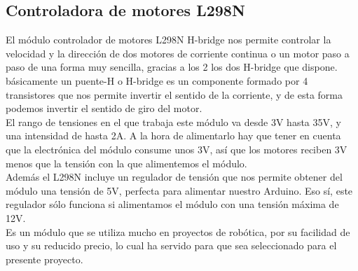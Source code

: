 \subsection{Controladora de motores L298N}


El módulo controlador de motores L298N H-bridge nos permite controlar la velocidad y la dirección de dos motores de corriente continua o un motor paso a paso de una forma muy sencilla,
gracias a los 2 los dos H-bridge que dispone.\\

básicamente un puente-H o H-bridge es un componente formado por 4 transistores que nos permite invertir el sentido de la corriente, y de esta forma podemos 
invertir el sentido de giro del motor.\\

El rango de tensiones en el que trabaja este módulo va desde 3V hasta 35V, y una intensidad de hasta 2A. A la hora de alimentarlo hay que tener en cuenta que la 
electrónica del módulo consume unos 3V, así que los motores reciben 3V menos que la tensión con la que alimentemos el módulo.\\

Además el L298N incluye un regulador de tensión que nos permite obtener del módulo una tensión de 5V, perfecta para alimentar nuestro Arduino. Eso sí, este regulador sólo 
funciona si alimentamos el módulo con una tensión máxima de 12V.\\

Es un módulo que se utiliza mucho en proyectos de robótica, por su facilidad de uso y su reducido precio, lo cual ha servido para que sea seleccionado para el presente proyecto.

